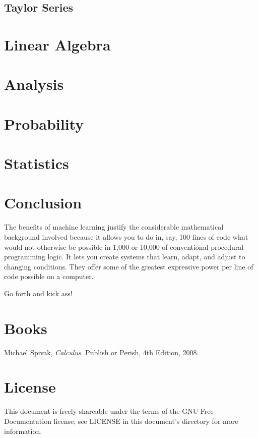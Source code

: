 \documentclass{article}
\begin{document}
\subsection{Taylor Series}

\section{Linear Algebra}

\section{Analysis}

\section{Probability}

\section{Statistics}

\section{Conclusion}

The benefits of machine learning justify the considerable mathematical
background involved because it allows you to do in, say, 100 lines of code what
would not otherwise be possible in 1,000 or 10,000 of conventional procedural
programming logic. It lets you create systems that learn, adapt, and adjust to
changing conditions. They offer some of the greatest expressive power per line
of code possible on a computer.

Go forth and kick ass!

\section{Books}

\begin{thebibliography}{9}

  Michael Spivak,
  \emph{Calculus}.
  Publish or Perish,
  4th Edition,
  2008.

\end{thebibliography}

\section{License}

This document is freely shareable under the terms of the GNU Free Documentation
license; see LICENSE in this document's directory for more information.
\end{document}
